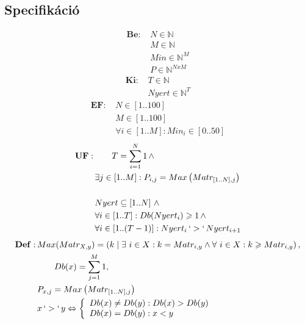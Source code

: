 \documentclass[a4paper]{article}
\begin{document}
    \subsection{Specifikáció}
    \begin{align*}
      \mathbf{Be:}\, &N \in \mathbb{N} \\
      &M \in \mathbb{N} \\
      &Min \in \mathbb{N}^M \\
      &P \in \mathbb{N}^{NxM}
    \end{align*}
    \begin{align*}
      \mathbf{Ki:}\, &T \in \mathbb{N} \\
      &Nyert \in \mathbb{N}^T
    \end{align*}
    \begin{align*}
      \mathbf{EF:}\, &N \in \left [ 1 .. 100 \right ] \\
      &M \in \left [ 1 .. 100 \right ] \\
      &\forall i \in \left [ 1 .. M \right ] : Min_i \in \left [ 0 .. 50 \right ]
    \end{align*}
    \begin{align*}
      \mathbf{UF:}\, &\qquad T=\sum_{i=1}^{N}1 \, \wedge \\
      &\exists j \in \left [ 1 .. M \right ] : P_{i,j}=Max \left ( Matr_{\left [ 1 .. N \right ], j} \right ) \\
      \\
      &Nyert \subseteq \left [ 1 .. N \right ] \, \wedge \\
      &\forall i \in \left [ 1 .. T \right ] : Db(Nyert_i) \geqslant 1 \, \wedge \\
      &\forall i \in \left[ 1 .. (T-1) \right ] : Nyert_i \, `>` \, Nyert_{i+1}
    \end{align*}
    \begin{align*}
      \mathbf{Def:}\, &Max(Matr_{X,y})=\left (k\mid \exists \ i\in X: k= Matr_{i,y} \wedge \forall \ i \in X: k \geqslant Matr_{i,y} \right ) , \\
      &\qquad Db(x)=\sum_{j=1}^{M}1 ,  \\
      &P_{x,j}=Max\left(Matr_{\left [ 1..N \right ],j}\right) \\
      &x \, `>` \, y \Leftrightarrow \left\{
                \begin{array}{ll}
                  Db(x) \neq Db(y) : Db(x) > Db(y)\\
                  Db(x) = Db(y) : x < y\\
                \end{array}
              \right.
    \end{align*}
\end{document}
